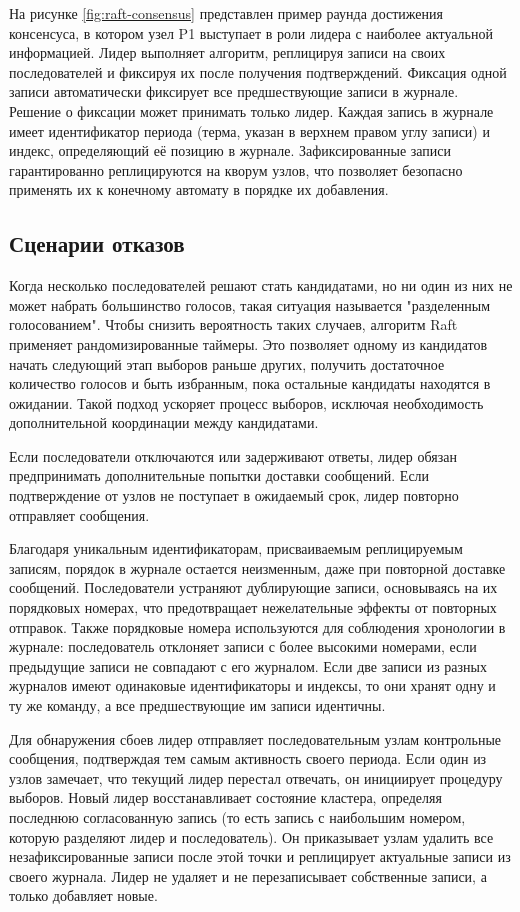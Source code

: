 На рисунке \ref{fig:raft-consensus} представлен пример раунда достижения
консенсуса, в котором узел P1 выступает в роли лидера с наиболее актуальной
информацией. Лидер выполняет алгоритм, реплицируя записи на своих последователей
и фиксируя их после получения подтверждений. Фиксация одной записи автоматически
фиксирует все предшествующие записи в журнале. Решение о фиксации может принимать
только лидер. Каждая запись в журнале имеет идентификатор периода (терма, указан в
верхнем правом углу записи) и индекс, определяющий её позицию в журнале.
Зафиксированные записи гарантированно реплицируются на кворум узлов, что
позволяет безопасно применять их к конечному автомату в порядке их добавления.

\subsection{Сценарии отказов}

Когда несколько последователей решают стать кандидатами, но ни один из них не
может набрать большинство голосов, такая ситуация называется "разделенным
голосованием". Чтобы снизить вероятность таких случаев, алгоритм Raft применяет
рандомизированные таймеры. Это позволяет одному из кандидатов начать следующий
этап выборов раньше других, получить достаточное количество голосов и быть
избранным, пока остальные кандидаты находятся в ожидании. Такой подход ускоряет
процесс выборов, исключая необходимость дополнительной координации между кандидатами.

Если последователи отключаются или задерживают ответы, лидер обязан
предпринимать дополнительные попытки доставки сообщений. Если подтверждение от
узлов не поступает в ожидаемый срок, лидер повторно отправляет сообщения.

Благодаря уникальным идентификаторам, присваиваемым реплицируемым записям,
порядок в журнале остается неизменным, даже при повторной доставке сообщений.
Последователи устраняют дублирующие записи, основываясь на их порядковых номерах,
что предотвращает нежелательные эффекты от повторных отправок. Также порядковые
номера используются для соблюдения хронологии в журнале: последователь отклоняет
записи с более высокими номерами, если предыдущие записи не совпадают с
его журналом. Если две записи из разных журналов имеют одинаковые идентификаторы
и индексы, то они хранят одну и ту же команду, а все предшествующие им записи
идентичны.

Для обнаружения сбоев лидер отправляет последовательным узлам контрольные
сообщения, подтверждая тем самым активность своего периода. Если один из узлов
замечает, что текущий лидер перестал отвечать, он инициирует процедуру выборов.
Новый лидер восстанавливает состояние кластера, определяя последнюю согласованную
запись (то есть запись с наибольшим номером, которую разделяют лидер и последователь).
Он приказывает узлам удалить все незафиксированные записи после этой точки и
реплицирует актуальные записи из своего журнала. Лидер не удаляет и не
перезаписывает собственные записи, а только добавляет новые.

